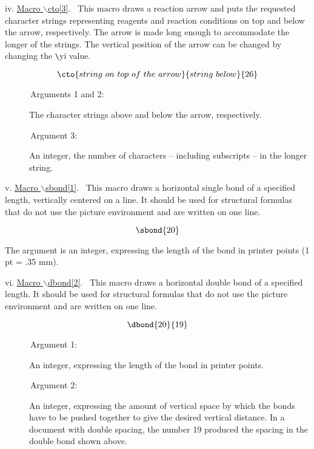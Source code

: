  \vspace{\len mm}
 \indent iv. \underline{Macro $\backslash $cto[3]}.
 \ This macro draws a reaction arrow and puts the requested
 character strings representing reagents and reaction
 conditions on top and below the arrow, respectively.
 The arrow is made long enough to accommodate the longer
 of the strings. The vertical position of the arrow can be
 changed by changing the \verb+\+yi value.

 \[ \cto{string\  on\  top\  of\  the\  arrow}{string\  below}{26} \]

 \begin{description}
 \item[{\rm \ \ \ \ \ \ Arguments 1 and 2:}] The character 
      strings above and below the arrow, respectively.
 \item[{\rm \ \ \ \ \ \ Argument 3:}] An integer, the number of characters -- 
      including subscripts -- in the longer string.
 \end{description}
 
 \vspace{\len mm}
 \indent v. \underline{Macro $\backslash $sbond[1]}.
 \ This macro draws a horizontal single bond of a specified
 length, vertically centered on a line. It should be used
 for structural formulas that do not use the picture
 environment and are written on one line.

 \[ \sbond{20}  \]

 The argument is an integer, expressing the length of the
 bond in printer points (1 pt = .35 mm).
 
 \vspace{\len mm}
 \indent vi. \underline{Macro $\backslash $dbond[2]}.
 \  This macro draws a horizontal double bond of a
 specified length. It should be used for structural
 formulas that do not use the picture environment and
 are written on one line.

 \[ \dbond{20}{19}  \]

 \begin{description}
 \item[{\rm \ \ \ \ \ \ Argument 1:}] An integer, expressing
      the length of the bond in printer points.
 \item[{\rm \ \ \ \ \ \ Argument 2:}] An integer, expressing
      the amount of vertical space by which the bonds have
      to be pushed together to give the desired vertical
      distance. In a document with double spacing, the
      number 19 produced the spacing in the double bond
      shown above. 
 \end{description}

